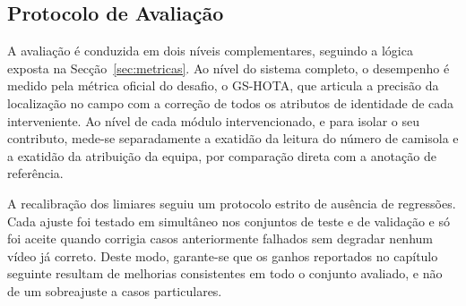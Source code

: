 \subsection{Protocolo de Avaliação}

A avaliação é conduzida em dois níveis complementares, seguindo a lógica exposta na
Secção~\ref{sec:metricas}. Ao nível do sistema completo, o desempenho é medido pela métrica oficial
do desafio, o GS-HOTA, que articula a precisão da localização no campo com a correção de todos os
atributos de identidade de cada interveniente. Ao nível de cada módulo intervencionado, e para isolar
o seu contributo, mede-se separadamente a exatidão da leitura do número de camisola e a exatidão da
atribuição da equipa, por comparação direta com a anotação de referência.

A recalibração dos limiares seguiu um protocolo estrito de ausência de regressões. Cada ajuste foi
testado em simultâneo nos conjuntos de teste e de validação e só foi aceite quando corrigia casos
anteriormente falhados sem degradar nenhum vídeo já correto. Deste modo, garante-se que os ganhos
reportados no capítulo seguinte resultam de melhorias consistentes em todo o conjunto avaliado, e não
de um sobreajuste a casos particulares.
